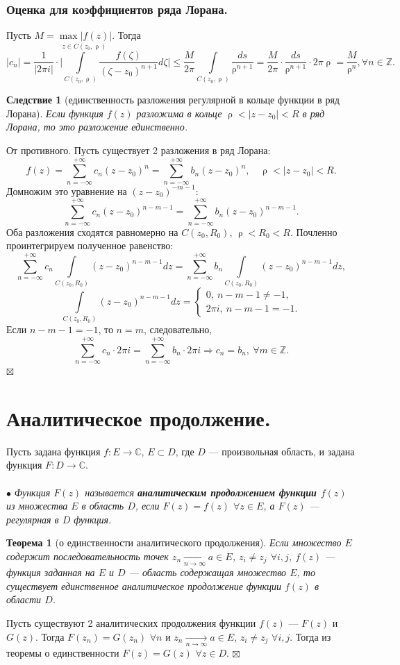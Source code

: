 \documentclass[a4paper, 12pt]{article}
\newenvironment{Proof} %
{\par\noindent{$\blacklozenge$}} %
{\hfill$\scriptstyle\boxtimes$}
\newcommand{\Cm}{\mathbb{C}}
\newcommand{\Z}{\mathbb{Z}}
\renewcommand{\leq}{\leqslant}
\renewcommand{\rho}{\uprho}
\newcommand{\sumrl}{\sum\limits_{n=-\infty}^{+\infty}}
\newtheorem*{theorem}{Теорема}
\newtheorem*{cor}{Следствие}
\begin{document}
\subsubsection*{Оценка для коэффициентов ряда Лорана.}
Пусть $M = \underset{z\in C(z_0,\rho)}{\max|f(z)|}$. Тогда $$|c_n| = \dfrac{1}{|2\pi i|}\cdot \Big|\int\limits_{C(z_0,\rho)}\dfrac{f(\zeta)}{(\zeta - z_0)^{n+1}}d\zeta \Big|\leq \dfrac{M}{2\pi}\int\limits_{C(z_0,\rho)}\dfrac{ds}{\rho^{n+1}} = \dfrac{M}{2\pi}\cdot \dfrac{ds}{\rho^{n+1}}\cdot 2\pi \rho = \dfrac{M}{\rho ^ n}, \forall n \in \Z.$$\begin{cor}
	[единственность разложения регулярной в кольце функции в ряд Лорана]
	Если функция $f(z)$ разложима в кольце $\rho < |z-z_0| < R$ в ряд Лорана, то это разложение единственно.
\end{cor}
\begin{Proof}
	От противного. Пусть существует 2 разложения в ряд Лорана: $$f(z) = \sumrl c_n(z-z_0)^n = \sumrl b_n(z-z_0)^n,\quad \rho < |z-z_0| < R.$$
	Домножим это уравнение на $(z-z_0)^{-m-1}$:
	$$\sumrl c_n(z-z_0)^{n-m-1} = \sumrl b_n(z-z_0)^{n-m-1}.$$
	Оба разложения сходятся равномерно на $C(z_0,R_0)$, $\rho < R_0<R$. Почленно проинтегрируем полученное равенство: $$\sumrl c_n \int\limits_{C(z_0,R_0)}(z-z_0)^{n-m-1}dz = \sumrl b_n \int\limits_{C(z_0,R_0)}(z-z_0)^{n-m-1}dz,$$
	$$\int\limits_{C(z_0,R_0)}(z-z_0)^{n-m-1}dz = \begin{cases}
		0,\ n-m-1 \ne -1,\\
		2\pi i,\ n-m-1 = -1.
	\end{cases}$$ 
Если $n-m-1 = -1$, то $n=m$, следовательно, $$\sumrl c_n\cdot 2\pi i = \sumrl b_n\cdot 2\pi i \Rightarrow c_n = b_n,\ \forall m \in \Z.$$ 
\end{Proof}
\section{Аналитическое продолжение.}
Пусть задана функция $f : E\to \Cm$, $E\subset D$, где $D$ --- произвольная область, и задана функция $F: D \to \Cm$.\\\\
$\bullet$ \textit{Функция $F(z)$ называется \textbf{аналитическим продолжением функции $f(z)$} из множества $E$ в область $D$, если $F(z) = f(z)$ $\forall z \in E$, а $F(z)$ --- регулярная в $D$ функция.}
\begin{theorem}
	[о единственности аналитического продолжения]
	Если множество $E$ содержит последовательность точек $z_n\underset{n\to \infty}{\longrightarrow} a \in E$, $z_i \ne z_j$ $\forall i,j$, $f(z)$ --- функция заданная на $E$ и $D$ --- область содержащая множество $E$, то существует единственное аналитическое продолжение функции $f(z)$ в области $D$.
\end{theorem}
\begin{Proof}
	Пусть существуют 2 аналитических продолжения функции $f(z)$ --- $F(z)$ и $G(z)$. Тогда $F(z_n) = G(z_n)$ $\forall n$ и  $z_n\underset{n\to \infty}{\longrightarrow} a \in E$, $z_i \ne z_j$ $\forall i,j$. Тогда из теоремы о единственности $F(z) = G(z)$ $\forall z \in D$.
\end{Proof}
\end{document}
